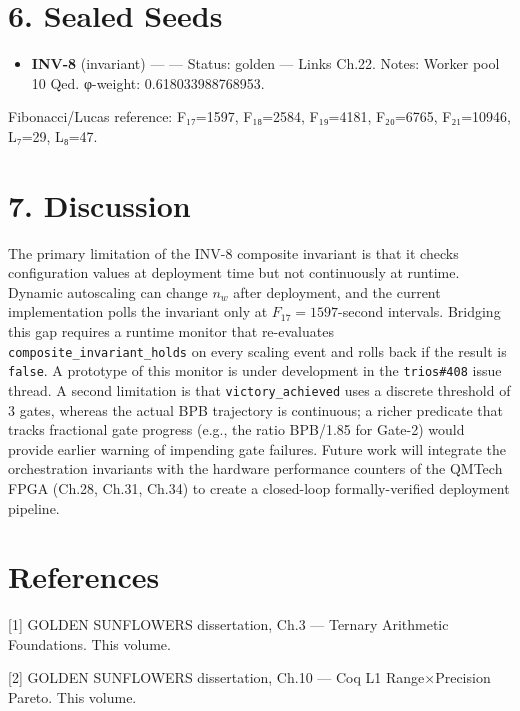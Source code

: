 \section{6. Sealed Seeds}\label{fa_22:sealed-seeds}

\begin{itemize}
\tightlist
\item
  \textbf{INV-8} (invariant) ---
  --- Status: golden --- Links Ch.22. Notes:
  Worker pool 10 Qed. φ-weight: 0.618033988768953.
\end{itemize}

Fibonacci/Lucas reference: F₁₇=1597, F₁₈=2584,
F₁₉=4181, F₂₀=6765, F₂₁=10946, L₇=29, L₈=47.

\section{7. Discussion}\label{fa_22:discussion}

The primary limitation of the INV-8 composite
invariant is that it checks configuration values
at deployment time but not continuously at
runtime. Dynamic autoscaling can change \(n_w\)
after deployment, and the current implementation
polls the invariant only at
\(F_{17} = 1597\)-second intervals. Bridging this
gap requires a runtime monitor that re-evaluates
\texttt{composite\_invariant\_holds} on every
scaling event and rolls back if the result is
\texttt{false}. A prototype of this monitor is
under development in the \texttt{trios\#408} issue
thread. A second limitation is that
\texttt{victory\_achieved} uses a discrete
threshold of 3 gates, whereas the actual BPB
trajectory is continuous; a richer predicate that
tracks fractional gate progress (e.g., the ratio
BPB/1.85 for Gate-2) would provide earlier warning
of impending gate failures. Future work will
integrate the orchestration invariants with the
hardware performance counters of the QMTech FPGA
(Ch.28, Ch.31, Ch.34) to create a closed-loop
formally-verified deployment pipeline.

\section{References}\label{fa_22:references}

[1] GOLDEN SUNFLOWERS dissertation, Ch.3 ---
Ternary Arithmetic Foundations. This volume.

[2] GOLDEN SUNFLOWERS dissertation, Ch.10 ---
Coq L1 Range$\times$Precision Pareto. This volume.

